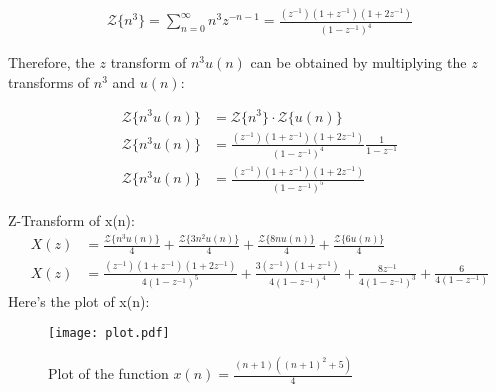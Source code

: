 \documentclass{article}
\begin{document}
\begin{align}
 \mathcal{Z}\{n^3\} = \sum_{n=0}^{\infty} n^3z^{-n-1} = \frac{(z^{-1})(1+z^{-1})(1+2z^{-1})}{(1-z^{-1})^4}
  \end{align}



Therefore, the $z$ transform of $n^3u(n)$ can be obtained by multiplying the $z$ transforms of $n^3$ and $u(n)$:

\begin{align}
\mathcal{Z}\{n^3u(n)\} &= \mathcal{Z}\{n^3\} \cdot \mathcal{Z}\{u(n)\} \\
\mathcal{Z}\{n^3u(n)\}&= \frac{(z^{-1})(1+z^{-1})(1+2z^{-1})}{(1-z^{-1})^4} \frac{1}{1-z^{-1}} \\
\mathcal{Z}\{n^3u(n)\}&= \frac{(z^{-1})(1+z^{-1})(1+2z^{-1})}{(1-z^{-1})^5} 
\end{align}

Z-Transform of x(n):
\begin{align}
X(z) &=  \frac{\mathcal{Z}\{n^3u(n)\}}{4}+ \frac{\mathcal{Z}\{3n^2u(n)\}}{4}+ \frac{\mathcal{Z}\{8nu(n)\}}{4}+ \frac{\mathcal{Z}\{6u(n)\}}{4}\\
X(z)&= \frac{(z^{-1})(1+z^{-1})(1+2z^{-1})}{4(1-z^{-1})^5}+ \frac{3(z^{-1})(1+z^{-1})}{4(1-z^{-1})^4}+\frac{8z^{-1}}{4(1-z^{-1})^3}+\frac{6}{4(1- z^{-1})}
\end{align}
\newpage
Here's the plot of x(n):

\begin{figure}[h]
  \centering
  \texttt{[image: plot.pdf]} %
  \caption{Plot of the function $x(n) = \frac{(n+1)((n+1)^2+5)}{4}$}
  \label{fig:plot}
\end{figure}
\end{document}

